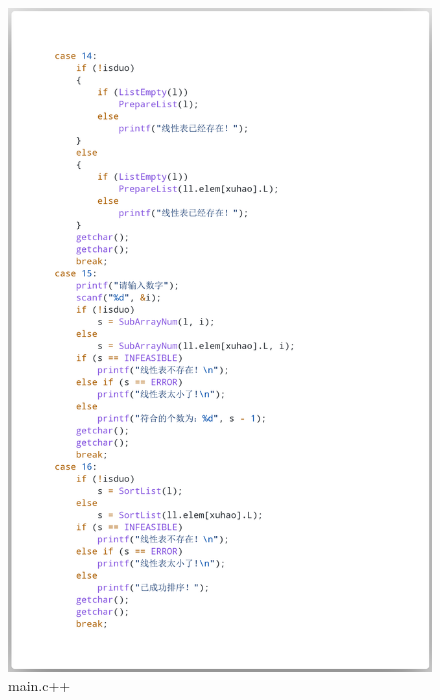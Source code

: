 \documentclass[supercite]{Experimental_Report}
\theoremstyle{definition}
\begin{document}
\begin{figure}[htb]
	\begin{center}
		\includegraphics[scale=0.30]{images/3-14.png}
		\caption{main.c++}
		\label{fig3-14}
	\end{center}
\end{figure}
\end{document}
